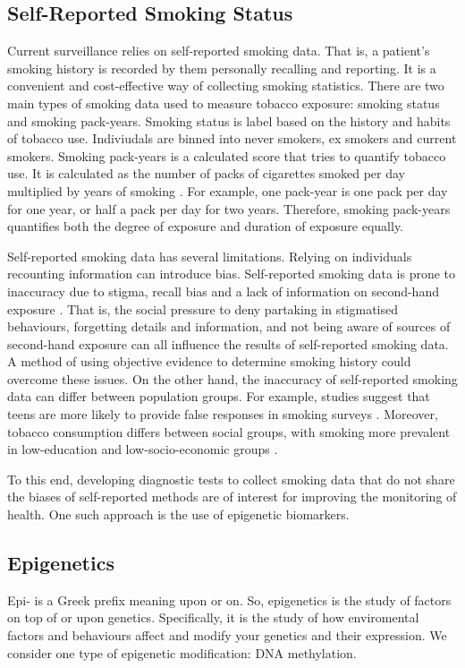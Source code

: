 \documentclass{article}
\begin{document}
\subsection{Self-Reported Smoking Status}
Current surveillance relies on self-reported smoking data. That is, a patient's smoking history is recorded by them personally recalling and reporting. It is a convenient and cost-effective way of collecting smoking statistics. There are two main types of smoking data used to measure tobacco exposure: smoking status and smoking pack-years. Smoking status is label based on the history and habits of tobacco use. Indiviudals are binned into never smokers, ex smokers and current smokers. Smoking pack-years is a calculated score that tries to quantify tobacco use. It is calculated as the number of packs of cigarettes smoked per day multiplied by years of smoking \cite{NCI_pack_year}. For example, one pack-year is one pack per day for one year, or half a pack per day for two years. Therefore, smoking pack-years quantifies both the degree of exposure and duration of exposure equally.

Self-reported smoking data has several limitations. Relying on individuals recounting information can introduce bias. Self-reported smoking data is prone to inaccuracy due to stigma, recall bias and a lack of information on second-hand exposure \cite{park2015correlation}. That is, the social pressure to deny partaking in stigmatised behaviours, forgetting details and information, and not being aware of sources of second-hand exposure can all influence the results of self-reported smoking data. A method of using objective evidence to determine smoking history could overcome these issues. On the other hand, the inaccuracy of self-reported smoking data can differ between population groups. For example, studies suggest that teens are more likely to provide false responses in smoking surveys \cite{park2015correlation}. Moreover, tobacco consumption differs between social groups, with smoking more prevalent in low-education and low-socio-economic groups \cite{cdc2019_smoking}.

To this end, developing diagnostic tests to collect smoking data that do not share the biases of self-reported methods are of interest for improving the monitoring of health. One such approach is the use of epigenetic biomarkers.

\subsection{Epigenetics}
Epi- is a Greek prefix meaning upon or on. So, epigenetics is the study of factors on top of or upon genetics. Specifically, it is the study of how enviromental factors and behaviours affect and modify your genetics and their expression. We consider one type of epigenetic modification: DNA methylation.
\end{document}
